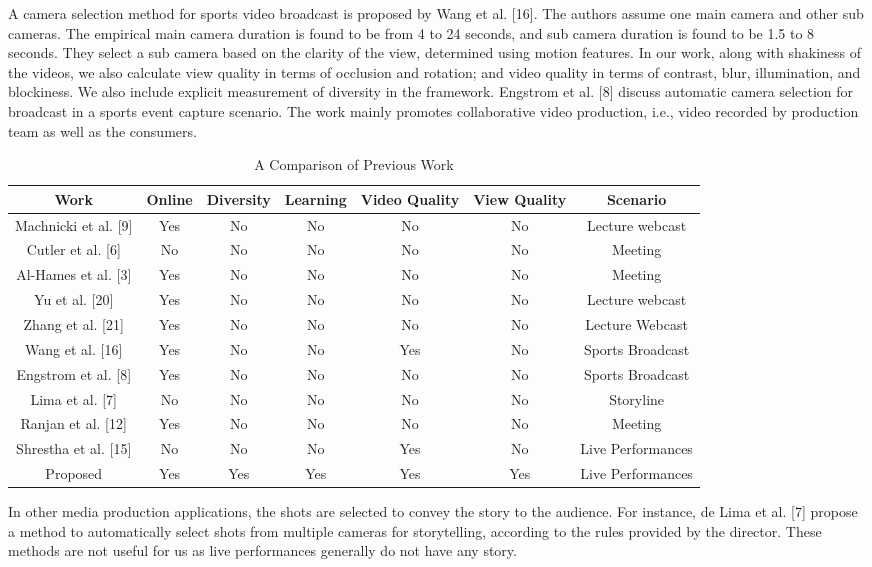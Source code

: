 \documentclass{clsfile}
\begin{document}
A camera selection method for sports video broadcast is proposed by Wang et al. [16]. The authors assume one main camera and other sub cameras. The empirical main camera duration is found to be from 4 to 24 seconds, and sub camera duration is found to be 1.5 to 8 seconds. They select a sub camera based on the clarity of the view, determined using motion features. In our work, along with shakiness of the videos, we also calculate view quality in terms of occlusion and rotation; and video quality in terms of contrast, blur, illumination, and blockiness. We also include explicit measurement of diversity in the framework. Engstrom et al. [8] discuss automatic camera selection for broadcast in a sports event capture scenario. The work mainly promotes collaborative video production, i.e., video recorded by production team as well as the consumers.
\begin{table}
\centering
\caption{  A Comparison of Previous Work }
\begin{tabular}{c|c|c|c|c|c|c} \hline
Work&Online&Diversity& Learning& Video Quality& View Quality &Scenario\\ \hline
Machnicki et al. [9]& Yes& No& No& No& No& Lecture webcast\\ \hline
Cutler et al. [6]& No& No &No& No& No& Meeting \\ \hline
Al-Hames et al. [3]& Yes& No &No &No& No& Meeting\\ \hline
Yu et al. [20]& Yes& No& No& No& No &Lecture webcast\\ \hline
Zhang et al. [21]& Yes& No &No& No& No& Lecture Webcast\\ \hline
Wang et al. [16]& Yes& No &No& Yes& No& Sports Broadcast\\ \hline
Engstrom et al. [8]& Yes& No& No& No& No& Sports Broadcast \\ \hline
Lima et al. [7] &No& No& No& No& No& Storyline \\ \hline
Ranjan et al. [12]& Yes& No& No& No& No& Meeting\\ \hline
Shrestha et al. [15]& No& No& No& Yes& No &Live Performances\\ \hline
Proposed& Yes& Yes& Yes& Yes& Yes& Live Performances\\
\hline\end{tabular}
\end{table}

In other media production applications, the shots are selected to convey the story to the audience. For instance, de Lima et al. [7] propose a method to automatically select shots from multiple cameras for storytelling, according to the rules provided by the director. These methods are not useful for us as live performances generally do not have any story.
\end{document}

